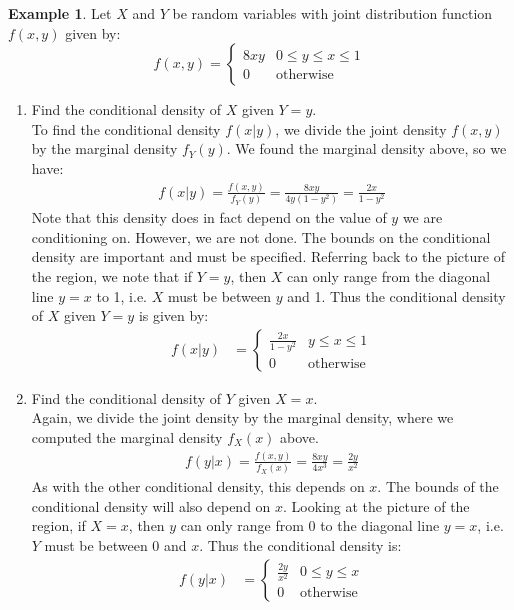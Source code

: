 \documentclass[12pt]{article}
\theoremstyle{definition}
\newtheorem*{example}{Example}
\theoremstyle{remark}
\begin{document}
\begin{example}
Let $X$ and $Y$ be random variables with joint distribution function $f(x, y)$ given by:
\[
f(x, y) = \begin{cases} 
      8 x y  & 0 \leq y \leq x \leq 1 \\
      0 & \textrm{otherwise}
   \end{cases}
\]
\begin{enumerate}

\item Find the conditional density of $X$ given $Y = y$.\\

To find the conditional density $f(x|y)$, we divide the joint density $f(x, y)$ by the marginal density $f_Y(y)$. We found the marginal density above, so we have:
\begin{align*}
f(x|y) = \frac{f(x, y)}{f_Y(y)} = \frac{8 x y}{4y(1 - y^2) } = \frac{2x}{1 - y^2} 
\end{align*}
Note that this density does in fact depend on the value of $y$ we are conditioning on. However, we are not done. The bounds on the conditional density are important and must be specified. Referring back to the picture of the region, we note that if $Y = y$, then $X$ can only range from the diagonal line $y = x$ to 1, i.e. $X$ must be between $y$ and 1. Thus the conditional density of $X$ given $Y = y$ is given by:
\begin{align*}
f(x|y) &=  \begin{cases} 
      \frac{2x}{1 - y^2} & y \leq x \leq 1 \\
      0 & \textrm{otherwise}
   \end{cases}
\end{align*}

\item Find the conditional density of $Y$ given $X = x$.\\

Again, we divide the joint density by the marginal density, where we computed the marginal density $f_X(x)$ above.
\begin{align*}
f(y|x) = \frac{f(x, y)}{f_X(x)} = \frac{8 x y}{4x^3} = \frac{2y}{x^2}  
\end{align*}
As with the other conditional density, this depends on $x$. The bounds of the conditional density will also depend on $x$. Looking at the picture of the region, if $X = x$, then $y$ can only range from 0 to the diagonal line $y = x$, i.e. $Y$ must be between 0 and $x$. Thus the conditional density is:
\begin{align*}
f(y|x) &=  \begin{cases} 
      \frac{2y}{x^2}  & 0 \leq y \leq x \\
      0 & \textrm{otherwise}
   \end{cases}
\end{align*}


\end{enumerate}
\end{example}
\end{document}

